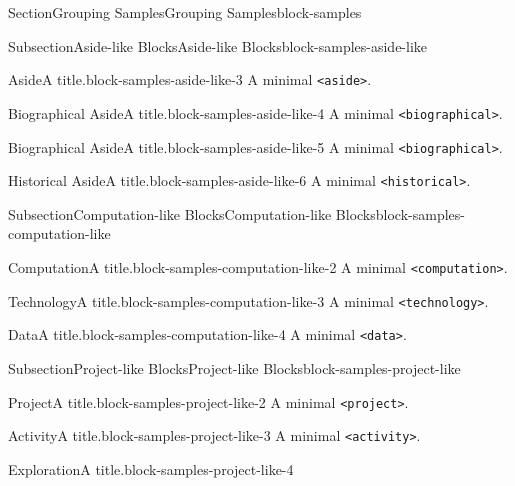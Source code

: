 \documentclass[twoside,10pt,]{article}
\newcommand{\mono}[1]{\texttt{#1}}
\numberwithin{equation}{section}
\begin{document}
\begin{sectionptx}{Section}{Grouping Samples}{}{Grouping Samples}{}{}{block-samples}
\begin{subsectionptx}{Subsection}{Aside-like Blocks}{}{Aside-like Blocks}{}{}{block-samples-aside-like}
\begin{aside}{Aside}{A title.}{block-samples-aside-like-3}%
A minimal \mono{<aside>}.%
\end{aside}
\begin{biographical}{Biographical Aside}{A title.}{block-samples-aside-like-4}%
A minimal \mono{<biographical>}.%
\end{biographical}
\begin{biographical}{Biographical Aside}{A title.}{block-samples-aside-like-5}%
A minimal \mono{<biographical>}.%
\end{biographical}
\begin{historical}{Historical Aside}{A title.}{block-samples-aside-like-6}%
A minimal \mono{<historical>}.%
\end{historical}
\end{subsectionptx}
%
%
\typeout{************************************************}
\typeout{************************************************}
%
\begin{subsectionptx}{Subsection}{Computation-like Blocks}{}{Computation-like Blocks}{}{}{block-samples-computation-like}
\begin{computation}{Computation}{A title.}{block-samples-computation-like-2}%
A minimal \mono{<computation>}.%
\end{computation}
\begin{technology}{Technology}{A title.}{block-samples-computation-like-3}%
A minimal \mono{<technology>}.%
\end{technology}
\begin{data}{Data}{A title.}{block-samples-computation-like-4}%
A minimal \mono{<data>}.%
\end{data}
\end{subsectionptx}
%
%
\typeout{************************************************}
\typeout{************************************************}
%
\begin{subsectionptx}{Subsection}{Project-like Blocks}{}{Project-like Blocks}{}{}{block-samples-project-like}
\begin{project}{Project}{A title.}{block-samples-project-like-2}%
A minimal \mono{<project>}.%
\end{project}%
\begin{activity}{Activity}{A title.}{block-samples-project-like-3}%
A minimal \mono{<activity>}.%
\end{activity}%
\begin{exploration}{Exploration}{A title.}{block-samples-project-like-4}%

\end{exploration}
\end{subsectionptx}
\end{sectionptx}
\end{document}
